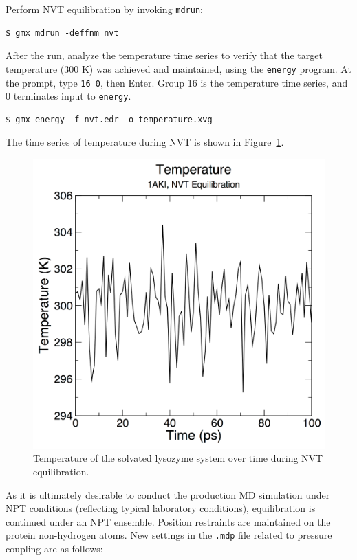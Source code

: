 \documentclass[9pt,tutorial,pubversion]{livecoms}
\begin{document}
Perform NVT equilibration by invoking \texttt{mdrun}:

\begin{lstlisting}
$ gmx mdrun -deffnm nvt
\end{lstlisting}

After the run, analyze the temperature time series to verify that the target temperature (300 K) was achieved and maintained, using the \texttt{energy} program. At the prompt, type \texttt{16 0}, then Enter. Group 16 is the temperature time series, and 0 terminates input to \texttt{energy}.

\begin{lstlisting}
$ gmx energy -f nvt.edr -o temperature.xvg
\end{lstlisting}

The time series of temperature during NVT is shown in Figure~\ref{lyso_nvt_temp_fig}.

\begin{figure}[h]
\centering
\includegraphics{plot_lyso_nvt_temperature}
\caption{Temperature of the solvated lysozyme system over time during NVT equilibration.}
\label{lyso_nvt_temp_fig}
\end{figure}

As it is ultimately desirable to conduct the production MD simulation under NPT conditions (reflecting typical laboratory conditions), equilibration is continued under an NPT ensemble. Position restraints are maintained on the protein non-hydrogen atoms. New settings in the \texttt{.mdp} file related to pressure coupling are as follows:
\end{document}
